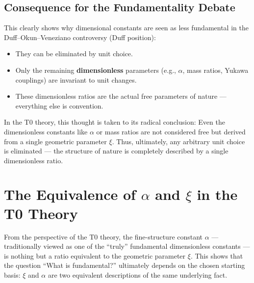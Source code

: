 	\subsection{Consequence for the Fundamentality Debate}
	This clearly shows why dimensional constants are seen as less fundamental in the Duff--Okun--Veneziano controversy (Duff position):
	\begin{itemize}
		\item They can be eliminated by unit choice.
		\item Only the remaining \textbf{dimensionless} parameters (e.g., $\alpha$, mass ratios, Yukawa couplings) are invariant to unit changes.
		\item These dimensionless ratios are the actual free parameters of nature --- everything else is convention.
	\end{itemize}
	In the T0 theory, this thought is taken to its radical conclusion: Even the dimensionless constants like $\alpha$ or mass ratios are not considered free but derived from a single geometric parameter $\xi$. Thus, ultimately, any arbitrary unit choice is eliminated --- the structure of nature is completely described by a single dimensionless ratio.
	
	\section{The Equivalence of $\alpha$ and $\xi$ in the T0 Theory}
	From the perspective of the T0 theory, the fine-structure constant $\alpha$ --- traditionally viewed as one of the ``truly'' fundamental dimensionless constants --- is nothing but a ratio equivalent to the geometric parameter $\xi$. This shows that the question ``What is fundamental?'' ultimately depends on the chosen starting basis: $\xi$ and $\alpha$ are two equivalent descriptions of the same underlying fact.
	
